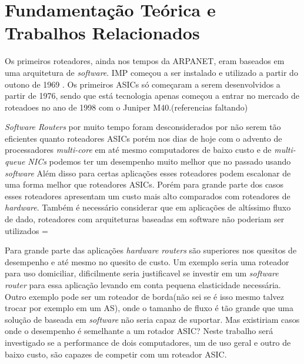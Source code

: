 \section{Fundamentação Teórica e Trabalhos Relacionados}
	Os primeiros roteadores, ainda nos tempos da ARPANET, eram baseados em uma arquitetura de \textit{software}. \ac{IMP} começou a ser instalado e utilizado a partir do outono de 1969 \cite{ARPA}. Os primeiros \acp{ASIC} só começaram a serem desenvolvidos a partir de 1976, sendo que está tecnologia apenas começou a entrar no mercado de roteadoes no ano de 1998 com o Juniper M40.(referencias faltando)

\textit{Software Routers} por muito tempo foram desconsiderados por não serem tão 
eficientes quanto roteadores ASICs porém nos dias de hoje com o advento de processadores
\textit{multi-core} em até mesmo computadores de baixo custo e de \textit{multi-queue NICs}
podemos ter um desempenho muito melhor que no passado usando \textit{software}\cite{linux}
Além disso para certas aplicações esses roteadores podem escalonar de uma forma melhor que roteadores ASICs. Porém para grande parte dos casos esses roteadores apresentam um custo mais alto comparados com roteadores de \textit{hardware}. Também é necessário considerar que em aplicações de altíssimo fluxo de dado, roteadores com arquiteturas baseadas em software não poderiam ser utilizados =

Para grande parte das aplicações \textit{hardware routers} são superiores nos quesitos de desempenho e até mesmo no quesito de custo. Um exemplo seria uma roteador para uso domiciliar, dificilmente seria justificavel se investir em um \textit{software router} para essa aplicação levando em conta pequena elasticidade necessária. Outro exemplo pode ser um roteador de borda(não sei se é isso mesmo talvez trocar por exemplo em um AS), onde o tamanho de fluxo é tão grande que uma solução de baseada em \textit{software} não seria capaz de suportar. Mas existiriam casos onde o desempenho é semelhante a um rotador \ac{ASIC}? Neste trabalho será investigado se a performance de dois computadores, um de uso geral e outro de baixo custo, são capazes de competir com um roteador ASIC.
